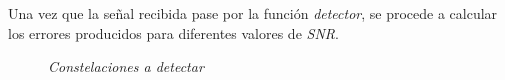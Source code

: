 \documentclass	[12pt,A4paper,titlepage]{article}
\begin{document}
Una vez que la señal recibida pase por la función \textit{detector}, se procede a calcular los errores producidos para diferentes valores de \textit{SNR}. 
\begin{figure}[H]
	\centering
	\caption{ \textit{Constelaciones a detectar} }
	\label{}
\end{figure}
\end{document}
